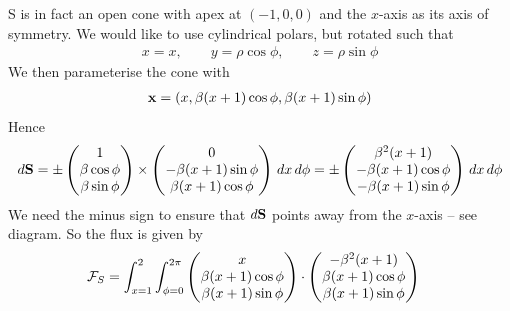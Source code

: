 \documentclass{../template/note}
\begin{document}
\begin{example*}[hard]
        S is in fact an open cone with apex at \((-1, 0, 0)\) and the \(x\)-axis as its axis of symmetry. We would like to use cylindrical polars, but rotated such that
        \begin{align*}
            x = x, \qquad y = \rho \cos \phi, \qquad z = \rho \sin \phi
        \end{align*}
        We then parameterise the cone with
        \begin{align*}
            \V x = (x, \beta(x+1) \cos \phi, \beta(x+1) \sin \phi)
        \end{align*}
        Hence
        \begin{align*}
            d \V S = \pm \begin{pmatrix}
             1 \\
             \beta \cos \phi \\
             \beta \sin \phi \\
            \end{pmatrix} \times \begin{pmatrix}
             0 \\
             -\beta(x+1)\sin\phi \\
             \beta(x+1)\cos\phi \\
            \end{pmatrix} \D x \D \phi = \pm \begin{pmatrix}
             \beta^2(x+1) \\
             -\beta(x+1)\cos\phi \\
             -\beta(x+1)\sin\phi \\
            \end{pmatrix} \D x \D \phi
        \end{align*}
        We need the minus sign to ensure that \(d\V S\) points away from the \(x\)-axis -- see diagram. So the flux is given by
        \begin{align*}
            \mathcal{F}_S &= \int_{x=1}^2 \int_{\phi=0}^{2\pi} \begin{pmatrix}
             x \\
             \beta(x+1)\cos\phi \\
             \beta(x+1)\sin\phi \\
            \end{pmatrix} \cdot \begin{pmatrix}
             -\beta^2(x+1) \\
             \beta(x+1)\cos\phi \\
             \beta(x+1)\sin\phi \\

\end{pmatrix}
\end{align*}
\end{example*}
\end{document}

